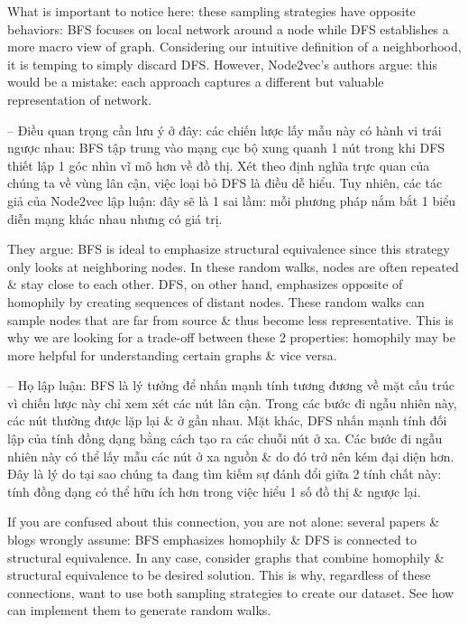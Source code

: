 \documentclass{article}
\begin{document}
\begin{itemize}
\begin{itemize}
\begin{itemize}
            What is important to notice here: these sampling strategies have opposite behaviors: BFS focuses on local network around a node while DFS establishes a more macro view of graph. Considering our intuitive definition of a neighborhood, it is temping to simply discard DFS. However, Node2vec's authors argue: this would be a mistake: each approach captures a different but valuable representation of network.

            -- Điều quan trọng cần lưu ý ở đây: các chiến lược lấy mẫu này có hành vi trái ngược nhau: BFS tập trung vào mạng cục bộ xung quanh 1 nút trong khi DFS thiết lập 1 góc nhìn vĩ mô hơn về đồ thị. Xét theo định nghĩa trực quan của chúng ta về vùng lân cận, việc loại bỏ DFS là điều dễ hiểu. Tuy nhiên, các tác giả của Node2vec lập luận: đây sẽ là 1 sai lầm: mỗi phương pháp nắm bắt 1 biểu diễn mạng khác nhau nhưng có giá trị.

            They argue: BFS is ideal to emphasize structural equivalence since this strategy only looks at neighboring nodes. In these random walks, nodes are often repeated \& stay close to each other. DFS, on other hand, emphasizes opposite of homophily by creating sequences of distant nodes. These random walks can sample nodes that are far from source \& thus become less representative. This is why we are looking for a trade-off between these 2 properties: homophily may be more helpful for understanding certain graphs \& vice versa.

            -- Họ lập luận: BFS là lý tưởng để nhấn mạnh tính tương đương về mặt cấu trúc vì chiến lược này chỉ xem xét các nút lân cận. Trong các bước đi ngẫu nhiên này, các nút thường được lặp lại \& ở gần nhau. Mặt khác, DFS nhấn mạnh tính đối lập của tính đồng dạng bằng cách tạo ra các chuỗi nút ở xa. Các bước đi ngẫu nhiên này có thể lấy mẫu các nút ở xa nguồn \& do đó trở nên kém đại diện hơn. Đây là lý do tại sao chúng ta đang tìm kiếm sự đánh đổi giữa 2 tính chất này: tính đồng dạng có thể hữu ích hơn trong việc hiểu 1 số đồ thị \& ngược lại.

            If you are confused about this connection, you are not alone: several papers \& blogs wrongly assume: BFS emphasizes homophily \& DFS is connected to structural equivalence. In any case, consider graphs that combine homophily \& structural equivalence to be desired solution. This is why, regardless of these connections, want to use both sampling strategies to create our dataset. See how can implement them to generate random walks.


\end{itemize}
\end{itemize}
\end{itemize}
\end{document}
